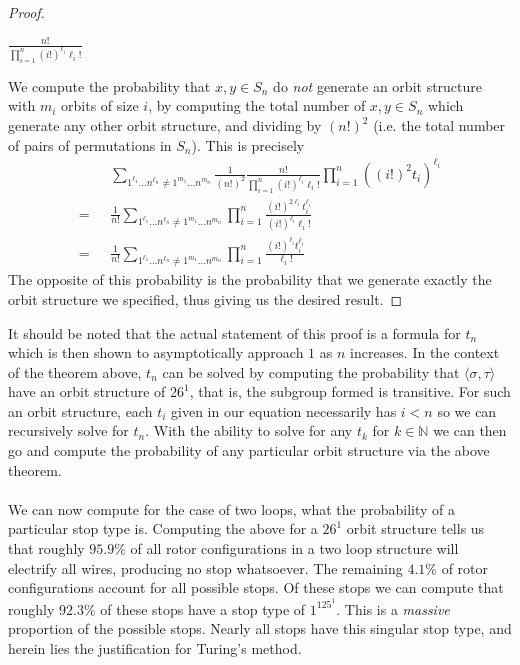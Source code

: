 \begin{proof}
\begin{center}
		$\frac{n!}{\prod_{i=1}^n{(i!)^{\ell_i}\ell_i!}}$
	\end{center}
	We compute the probability that $x,y\in S_n$ do \emph{not} generate an orbit structure with $m_i$ orbits of size $i$, by computing the total number of $x,y\in S_n$ which generate any other orbit structure, and dividing by $(n!)^2$ (i.e. the total number of pairs of permutations in $S_n$). This is precisely
	\begin{align*}
		          & \sum_{1^{\ell_1}\dots n^{\ell_n} \ne 1^{m_1}\dots n^{m_n}}{\frac{1}{(n!)^2}\frac{n!}{\prod_{i=1}^n{(i!)^{\ell_i}\ell_i!}}}\prod_{i=1}^n{((i!)^2t_i)^{\ell_i}} \\
		=\text{ } & \frac{1}{n!}\sum_{1^{\ell_1}\dots n^{\ell_n} \ne 1^{m_1}\dots n^{m_n}}{\prod_{i=1}^n{\frac{(i!)^{2\ell_i}t_i^{\ell_i}}{(i!)^{\ell_i}\ell_i!}}}                \\
		=\text{ } & \frac{1}{n!}\sum_{1^{\ell_1}\dots n^{\ell_n} \ne 1^{m_1}\dots n^{m_n}}{\prod_{i=1}^n{\frac{(i!)^{\ell_i}t_i^{\ell_i}}{
		\ell_i!}}}
	\end{align*}
	The opposite of this probability is the probability that we generate exactly the orbit structure we specified, thus giving us the desired result.
\end{proof}
\noindent It should be noted that the actual statement of this proof is a formula for $t_n$ which is then shown to asymptotically approach $1$ as $n$ increases. In the context of the theorem above, $t_n$ can be solved by computing the probability that $\langle \sigma, \tau\rangle$ have an orbit structure of $26^1$, that is, the subgroup formed is transitive. For such an orbit structure, each $t_i$ given in our equation necessarily has $i < n$ so we can recursively solve for $t_n$. With the ability to solve for any $t_k$ for $k\in\mathbb{N}$ we can then go and compute the probability of any particular orbit structure via the above theorem.
\\\\We can now compute for the case of two loops, what the probability of a particular stop type is. Computing the above for a $26^1$ orbit structure tells us that roughly $95.9\%$ of all rotor configurations in a two loop structure will electrify all wires, producing no stop whatsoever. The remaining $4.1\%$ of rotor configurations account for all possible stops. Of these stops we can compute that roughly $92.3\%$ of these stops have a stop type of $1^125^1$. This is a \emph{massive} proportion of the possible stops. Nearly all stops have this singular stop type, and herein lies the justification for Turing's method.
